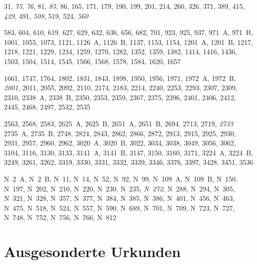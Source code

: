 {%
\setlength{\columnsep}{35pt} %
\raggedright
\begin{multicols}{2}
\begin{description}[
	font=\normalfont,
	labelsep=\fontdimen2\font,
	leftmargin=1.4cm, %
]
\item[\cite{cao1},] 31, \emph{75}, \emph{76}, 81, \emph{85}, 86, 165, 171, 179,
190, 199, 201, 214, 260, 326, 371, 389, 415, \emph{429}, 491, \emph{508}, 519,
524, \emph{560}

\item[\cite{cao2},] 583, 604, 610, 619, 627, 629, 632, 636, 656, 682, 701, 923,
925, 937, 971~A, 971~B, 1001, 1055, 1073, 1121, 1126~A, 1126~B, 1137, 1153,
1154, 1201~A, 1201~B, 1217, 1218, 1221, 1229, 1234, 1259, 1270, 1282, 1352,
1359, 1382, 1414, 1416, 1436, 1503, 1504, 1514, 1545, 1566, 1568, 1578, 1584,
1620, 1657

\item[\cite{cao3},] 1661, 1747, 1764, 1802, 1831, 1843, 1898, 1950, 1956, 1971,
1972~A, 1972~B, \emph{2001}, 2011, 2055, 2092, 2110, 2174, 2183, 2214, 2240,
2253, 2293, 2307, 2309, 2310, 2338~A, 2338~B, 2350, 2353, 2359, 2367, 2375,
2396, 2401, 2406, 2412, 2445, 2468, 2497, 2532, 2535

\item[\cite{cao4},] 2563, 2568, 2583, 2625~A, 2625~B, 2651~A, 2651~B, 2694, 2713,
2719, \emph{2733} 2735~A, 2735~B, 2748, 2824, 2843, 2862, 2866, 2872, 2913,
2915, 2925, 2930, 2931, 2957, 2960, 2962, 3020~A, 3020~B, 3022, 3034, 3038,
3049, 3056, 3062, 3104, 3116, 3130, 3133, 3141~A, 3141~B, 3147, 3150, 3160,
3171, 3224~A, 3224~B, 3249, 3261, 3262, 3319, 3330, 3331, 3332, 3339, 3346,
3376, 3397, 3428, 3451, 3536

\item[\cite{cao5},] N~2~A, N~2~B, N~11, N~14, N~52, N~92, N~99, N~109~A,
N~109~B, N~150, N~197, N~202, N~210, N~220, N~230, N~235, \emph{N~272}, N~288,
N~294, N~305, N~321, N~328, N~357, N~377, N~384, N~385, N~386, N~401, N~456,
N~463, N~475, N~518, N~524, N~557, N~590, N~689, N~701, N~709, N~723, N~727,
N~748, N~752, N~756, N~766, N~812
\end{description}
\end{multicols}
}


\section{Ausgesonderte Urkunden}
\label{subsec:ausgesurk}

